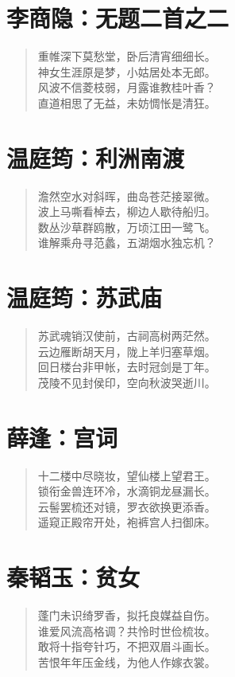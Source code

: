 \documentclass[12pt,oneside]{book}
\newenvironment{shici}{
\begin{verse}
\centering\large\hspace{12pt}}
{\end{verse}}
\begin{document}
\chapter{李商隐：无题二首之二}
\begin{shici}
重帷深下莫愁堂，卧后清宵细细长。\\
神女生涯原是梦，小姑居处本无郎。\\
风波不信菱枝弱，月露谁教桂叶香？\\
直道相思了无益，未妨惆怅是清狂。
\end{shici}

\chapter{温庭筠：利洲南渡}
\begin{shici}
澹然空水对斜晖，曲岛苍茫接翠微。\\
波上马嘶看棹去，柳边人歇待船归。\\
数丛沙草群鸥散，万顷江田一鹭飞。\\
谁解乘舟寻范蠡，五湖烟水独忘机？
\end{shici}

\chapter{温庭筠：苏武庙}
\begin{shici}
苏武魂销汉使前，古祠高树两茫然。\\
云边雁断胡天月，陇上羊归塞草烟。\\
回日楼台非甲帐，去时冠剑是丁年。\\
茂陵不见封侯印，空向秋波哭逝川。
\end{shici}

\chapter{薛逢：宫词}
\begin{shici}
十二楼中尽晓妆，望仙楼上望君王。\\
锁衔金兽连环冷，水滴铜龙昼漏长。\\
云髻罢梳还对镜，罗衣欲换更添香。\\
遥窥正殿帘开处，袍裤宫人扫御床。
\end{shici}

\chapter{秦韬玉：贫女}
\begin{shici}
蓬门未识绮罗香，拟托良媒益自伤。\\
谁爱风流高格调？共怜时世俭梳妆。\\
敢将十指夸针巧，不把双眉斗画长。\\
苦恨年年压金线，为他人作嫁衣裳。
\end{shici}
\end{document}
